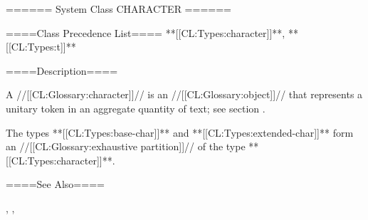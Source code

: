 ====== System Class CHARACTER ======

====Class Precedence List==== **[[CL:Types:character]]**, **[[CL:Types:t]]**

====Description====

A //[[CL:Glossary:character]]// is an //[[CL:Glossary:object]]// that represents a unitary token in an aggregate quantity of text; see section {\secref\CharacterConcepts}.

The types **[[CL:Types:base-char]]** and **[[CL:Types:extended-char]]** form an //[[CL:Glossary:exhaustive partition]]// of the type **[[CL:Types:character]]**.

====See Also====

{\secref\CharacterConcepts}, {\secref\SharpsignBackslash}, {\secref\PrintingCharacters}

 
